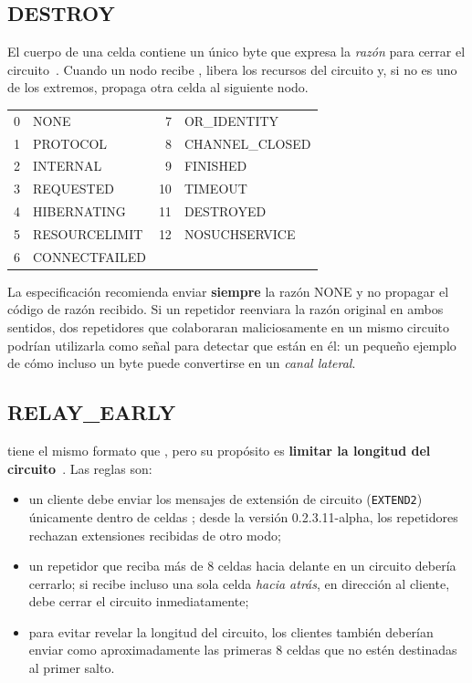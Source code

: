 \subsection{DESTROY}

El cuerpo de una celda  contiene un único byte que expresa la \emph{razón} para cerrar el circuito~. Cuando un nodo recibe , libera los recursos del circuito y, si no es uno de los extremos, propaga otra celda  al siguiente nodo.

\begin{center}\small
\begin{tabular}{rl@{\qquad}rl}
\toprule
0 & NONE & 7 & OR\_IDENTITY \\
1 & PROTOCOL & 8 & CHANNEL\_CLOSED \\
2 & INTERNAL & 9 & FINISHED \\
3 & REQUESTED & 10 & TIMEOUT \\
4 & HIBERNATING & 11 & DESTROYED \\
5 & RESOURCELIMIT & 12 & NOSUCHSERVICE \\
6 & CONNECTFAILED & & \\
\bottomrule
\end{tabular}
\end{center}

\begin{attenzione}
La especificación recomienda enviar \textbf{siempre} la razón NONE y no propagar el código de razón recibido. Si un repetidor reenviara la razón original en ambos sentidos, dos repetidores que colaboraran maliciosamente en un mismo circuito podrían utilizarla como señal para detectar que están en él: un pequeño ejemplo de cómo incluso un byte puede convertirse en un \emph{canal lateral}.
\end{attenzione}

\subsection{RELAY\_EARLY}

 tiene el mismo formato que , pero su propósito es \textbf{limitar la longitud del circuito}~. Las reglas son:

\begin{itemize}
  \item un cliente debe enviar los mensajes de extensión de circuito (\texttt{EXTEND2}) únicamente dentro de celdas ; desde la versión 0.2.3.11-alpha, los repetidores rechazan extensiones recibidas de otro modo;
  \item un repetidor que reciba más de 8 celdas  hacia delante en un circuito debería cerrarlo; si recibe incluso una sola celda \emph{hacia atrás}, en dirección al cliente, debe cerrar el circuito inmediatamente;
  \item para evitar revelar la longitud del circuito, los clientes también deberían enviar como  aproximadamente las primeras 8 celdas que no estén destinadas al primer salto.
\end{itemize}

